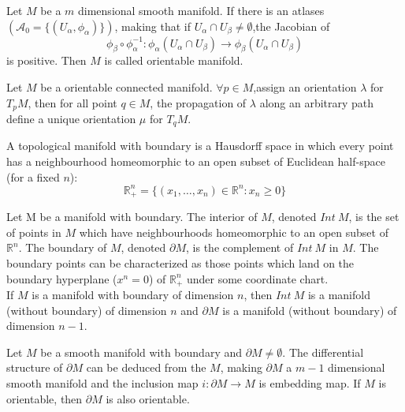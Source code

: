 \begin{newdef}
 Let $M$ be a $m$ dimensional smooth manifold. If there is an atlases $(\mathcal{A_0} = \{(U_{\alpha},\phi_{\alpha})\})$, making that if $U_{\alpha} \cap U_{\beta} \neq \emptyset$,the Jacobian of
\[\phi_{\beta} \circ \phi_{\alpha}^{-1} : \phi_{\alpha}(U_{\alpha} \cap U_{\beta}) \to \phi_{\beta}(U_{\alpha} \cap U_{\beta})\]
is positive. Then $M$ is called orientable manifold.
\end{newdef}

\begin{newthem}
Let $M$ be a orientable connected manifold. $\forall p \in M$,assign an orientation $\lambda$ for $T_pM$, then for all point $q \in M$, the propagation of $\lambda$ along an arbitrary path define a unique orientation $\mu$ for $T_q M$.
\end{newthem}

\begin{newdef}
A topological manifold with boundary is a Hausdorff space in which every point has a neighbourhood homeomorphic to an open subset of Euclidean half-space (for a fixed $n$):
\[\mathbb {R} _{+}^{n}=\{(x_{1},\ldots ,x_{n})\in \mathbb {R} ^{n}:x_{n}\geq 0\}\]
\end{newdef}


\begin{newdef}
Let M be a manifold with boundary. The interior of $M$, denoted $Int \ M$, is the set of points in $M$ which have neighbourhoods homeomorphic to an open subset of $\mathbb {R} ^{n}$. The boundary of $M$, denoted $\partial M$, is the complement of $Int \ M$ in $M$. The boundary points can be characterized as those points which land on the boundary hyperplane ($x^n=0$) of $ \mathbb {R} _{+}^{n}$ under some coordinate chart.\\
If $M$ is a manifold with boundary of dimension $n$, then $Int \ M$ is a manifold (without boundary) of dimension $n$ and $\partial M$ is a manifold (without boundary) of dimension $n-1$.
\end{newdef}

\begin{newthem}
Let $M$ be a smooth manifold with boundary and $\partial M \neq \emptyset$. The differential structure of $\partial M$ can be deduced from the $M$, making $\partial M$ a $m-1$ dimensional smooth manifold and the inclusion map $i:\partial M \to M$ is embedding map. If $M$ is orientable, then $\partial M$ is also orientable.
\end{newthem}

